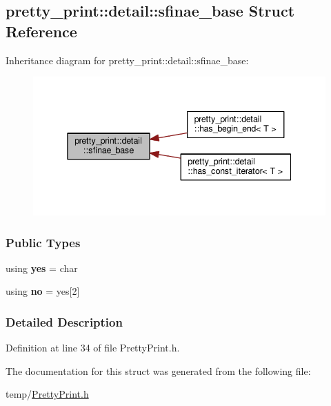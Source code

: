 \hypertarget{structpretty__print_1_1detail_1_1sfinae__base}{}\subsection{pretty\+\_\+print\+:\+:detail\+:\+:sfinae\+\_\+base Struct Reference}
\label{structpretty__print_1_1detail_1_1sfinae__base}


Inheritance diagram for pretty\+\_\+print\+:\+:detail\+:\+:sfinae\+\_\+base\+:\nopagebreak
\begin{figure}[H]
\begin{center}
\leavevmode
\includegraphics[width=338pt]{structpretty__print_1_1detail_1_1sfinae__base__inherit__graph}
\end{center}
\end{figure}
\subsubsection*{Public Types}
\begin{DoxyCompactItemize}
\item 
using {\bfseries yes} = char\hypertarget{structpretty__print_1_1detail_1_1sfinae__base_ab2562401cc1ef39e800d952786129009}{}\label{structpretty__print_1_1detail_1_1sfinae__base_ab2562401cc1ef39e800d952786129009}

\item 
using {\bfseries no} = yes\mbox{[}2\mbox{]}\hypertarget{structpretty__print_1_1detail_1_1sfinae__base_ab8ea87e476a507db1f9a3b50672f08ff}{}\label{structpretty__print_1_1detail_1_1sfinae__base_ab8ea87e476a507db1f9a3b50672f08ff}

\end{DoxyCompactItemize}


\subsubsection{Detailed Description}


Definition at line 34 of file Pretty\+Print.\+h.



The documentation for this struct was generated from the following file\+:\begin{DoxyCompactItemize}
\item 
temp/\hyperlink{PrettyPrint_8h}{Pretty\+Print.\+h}\end{DoxyCompactItemize}
